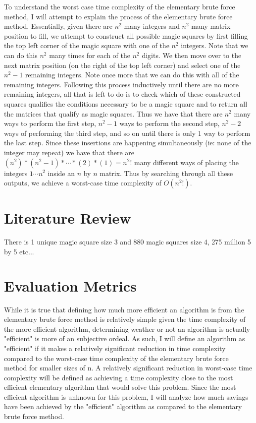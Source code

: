 \documentclass{article}
\begin{document}
    To understand the worst case time complexity of the elementary brute force method, I will attempt to explain the process of the elementary brute force method. Essentially, given there are $n^2$ many integers and $n^2$ many matrix position to fill, we attempt to construct all possible magic squares by first filling the top left corner of the magic square with one of the $n^2$ integers. Note that we can do this $n^2$ many times for each of the $n^2$ digits. We then move over to the next matrix position (on the right of the top left corner) and select one of the $n^2 - 1$ remaining integers. Note once more that we can do this with all of the remaining integers. Following this process inductively until there are no more remaining integers, all that is left to do is to check which of these constructed squares qualifies the conditions necessary to be a magic square and to return all the matrices that qualify as magic squares. Thus we have that there are $n^2$ many ways to perform the first step, $n^2 - 1$ ways to perform the second step, $n^2 - 2$ ways of performing the third step, and so on until there is only $1$ way to perform the last step. Since these insertions are happening simultaneously (ie: none of the integer may repeat) we have that there are $(n^2) * (n^2 - 1) * \cdots * (2) * (1) = n^2!$ many different ways of placing the integers $1\cdots n^2$ inside an $n$ by $n$ matrix. Thus by searching through all these outputs, we achieve a worst-case time complexity of $O(n^2!)$.
    
\section{Literature Review}
    There is 1 unique magic square size 3 and 880 magic squares size 4, 275 million 5 by 5 etc... %
\section{Evaluation Metrics}
    While it is true that defining how much more efficient an algorithm is from the elementary brute force method is relatively simple given the time complexity of the more efficient algorithm, determining weather or not an algorithm is actually "efficient" is more of an subjective ordeal. As such, I will define an algorithm as "efficient" if it makes a relatively significant reduction in time complexity compared to the worst-case time complexity of the elementary brute force method for smaller sizes of n. A relatively significant reduction in worst-case time complexity will be defined as achieving a time complexity close to the most efficient elementary algorithm that would solve this problem. Since the most efficient algorithm is unknown for this problem, I will analyze how much savings have been achieved by the "efficient" algorithm as compared to the elementary brute force method.    
\end{document}
